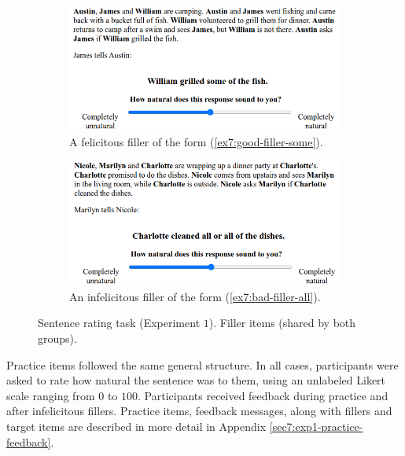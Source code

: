 \begin{figure}[H]
	\centering
	\begin{subfigure}[b]{.45\linewidth}
		\centering
		\includegraphics[width=\linewidth]{./images/exp1-screen-filler-good.png}
		\caption[]{A felicitous filler of the form (\ref{ex7:good-filler-some}).}
	\end{subfigure}
	\hfill
	\begin{subfigure}[b]{.45\linewidth}
		\centering
		\includegraphics[width=\linewidth]{./images/exp1-screen-filler-bad.png}
		\caption[]{An infelicitous filler of the form (\ref{ex7:bad-filler-all}).}
	\end{subfigure}

	\caption[]{Sentence rating task (Experiment $1$). Filler items (shared by both groups).}\label{fig7:exp1-screen-fillers}
\end{figure}

Practice items followed the same general structure. In all cases, participants were asked to rate how natural the sentence was to them, using an unlabeled Likert scale ranging from $0$ to $100$. Participants received feedback during practice and after infelicitous fillers. Practice items, feedback messages, along with fillers and target items are described in more detail in Appendix \ref{sec7:exp1-practice-feedback}.\\


